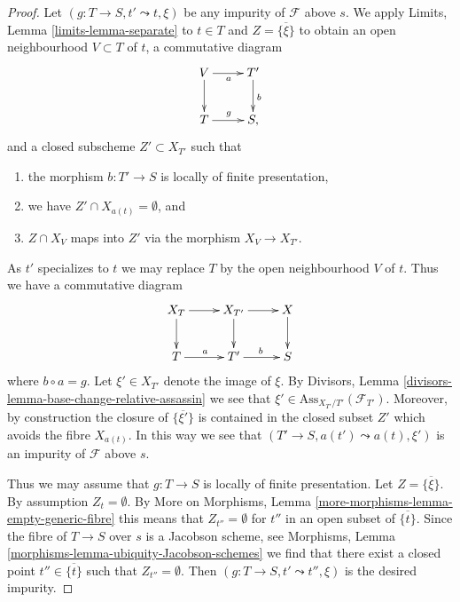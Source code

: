 \documentclass[10pt,a4paper]{amsart}
\theoremstyle{plain}
\theoremstyle{definition}
\theoremstyle{remark}
\numberwithin{equation}{subsection}
\begin{document}
\begin{proof}
Let $(g : T \to S, t' \leadsto t, \xi)$ be any impurity of
$\mathcal{F}$ above $s$. We apply
Limits, Lemma \ref{limits-lemma-separate}
to $t \in T$ and $Z = \overline{\{\xi\}}$ to obtain an open neighbourhood
$V \subset T$ of $t$, a commutative diagram
$$
\xymatrix{
V \ar[d] \ar[r]_a & T' \ar[d]^b \\
T \ar[r]^g & S,
}
$$
and a closed subscheme $Z' \subset X_{T'}$ such that
\begin{enumerate}
\item the morphism $b : T' \to S$ is locally of finite presentation,
\item we have $Z' \cap X_{a(t)} = \emptyset$, and
\item $Z \cap X_V$ maps into $Z'$ via the morphism $X_V \to X_{T'}$.
\end{enumerate}
As $t'$ specializes to $t$ we may replace $T$ by the open neighbourhood
$V$ of $t$. Thus we have a commutative diagram
$$
\xymatrix{
X_T \ar[d] \ar[r] &
X_{T'} \ar[d] \ar[r] &
X \ar[d] \\
T \ar[r]^a & T' \ar[r]^b & S
}
$$
where $b \circ a = g$. Let $\xi' \in X_{T'}$ denote the
image of $\xi$. By
Divisors, Lemma \ref{divisors-lemma-base-change-relative-assassin}
we see that $\xi' \in \text{Ass}_{X_{T'}/T'}(\mathcal{F}_{T'})$.
Moreover, by construction the closure of $\overline{\{\xi'\}}$
is contained in the closed subset $Z'$ which avoids the fibre
$X_{a(t)}$. In this way we see that $(T' \to S, a(t') \leadsto a(t), \xi')$
is an impurity of $\mathcal{F}$ above $s$.

\medskip\noindent
Thus we may assume that $g : T \to S$ is locally of finite presentation.
Let $Z = \overline{\{\xi\}}$. By assumption $Z_t = \emptyset$. By
More on Morphisms, Lemma \ref{more-morphisms-lemma-empty-generic-fibre}
this means that $Z_{t''} = \emptyset$ for $t''$ in an open subset
of $\overline{\{t\}}$. Since the fibre of
$T \to S$ over $s$ is a Jacobson scheme, see
Morphisms, Lemma \ref{morphisms-lemma-ubiquity-Jacobson-schemes}
we find that there exist a closed point $t'' \in \overline{\{t\}}$ such that
$Z_{t''} = \emptyset$. Then $(g : T \to S, t' \leadsto t'', \xi)$ is the
desired impurity.
\end{proof}
\end{document}

